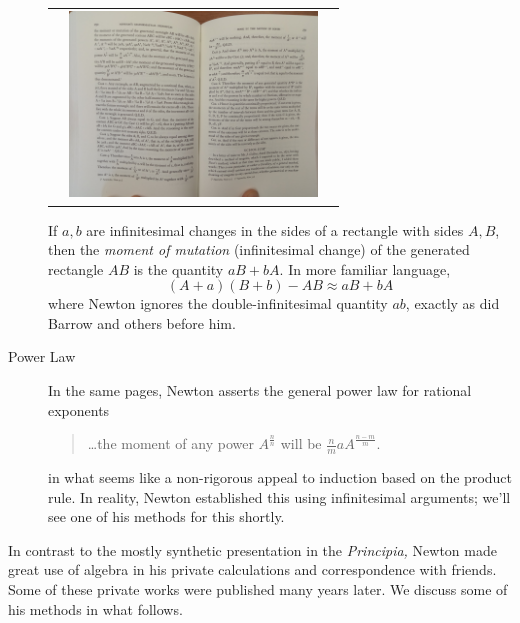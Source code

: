 \begin{description}
\begin{center}
\begin{tabular}{ccc}
			&
			\includegraphics[height=140pt]{newton9.jpg}
		\end{tabular}
	\end{center}
	If $a,b$ are infinitesimal changes in the sides of a rectangle with sides $A,B$, then the \emph{moment of mutation} (infinitesimal change) of the generated rectangle $AB$ is the quantity $aB+bA$. In more familiar language,
	\[
		(A+a)(B+b)-AB\approx aB+bA
	\]
	where Newton ignores the double-infinitesimal quantity $ab$, exactly as did Barrow and others before him.
	\item[Power Law] In the same pages, Newton asserts the general power law for rational exponents 
	\begin{quote}
		\ldots the moment of any power $\displaystyle A^{\frac nn}$ will be $\displaystyle\frac nmaA^{\frac{n-m}m}$.
	\end{quote}
	in what seems like a non-rigorous appeal to induction based on the product rule. In reality, Newton established this using infinitesimal arguments; we'll see one of his methods for this shortly. 
\end{description}

In contrast to the mostly synthetic presentation in the \emph{Principia,} Newton made great use of algebra in his private calculations and correspondence with friends. Some of these private works were published many years later. We discuss some of his methods in what follows.


\goodbreak


